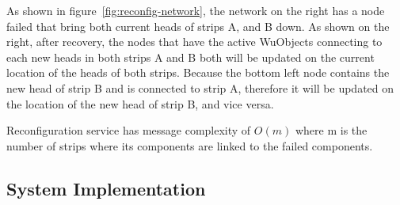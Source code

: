 As shown in figure~\ref{fig:reconfig-network}, the network on the right has
a node failed that bring both current heads of strips A, and B down. As shown
on the right, after recovery, the nodes that have the active WuObjects
connecting to each new heads in both strips A and B both will be updated on the
current location of the heads of both strips. Because the bottom left node
contains the new head of strip B and is connected to strip A, therefore it will
be updated on the location of the new head of strip B, and vice versa.

Reconfiguration service has message complexity of $O(m)$ where m is the
number of strips where its components are linked to the failed components.


\subsection{System Implementation}

